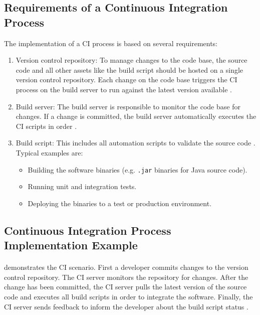 \subsection{Requirements of a Continuous Integration Process}
The implementation of a CI process is based on several requirements:
\begin{enumerate}
\item Version control repository:
To manage changes to the code base, the source code and all other assets like the build script should be hosted on a single version control repository.
Each change on the code base triggers the CI process on the build server to run against the latest version available \cite{Duvall2007CI}.

\item Build server:
The build server is responsible to monitor the code base for changes.
If a change is committed, the build server automatically executes the CI scripts in order \cite{Rossel2017CICD, Duvall2007CI}.

\item Build script:
This includes all automation scripts to validate the source code \cite{Duvall2007CI}. Typical examples are:
\begin{itemize}
\item Building the software binaries (e.g. \texttt{.jar} binaries for Java source code).
\item Running unit and integration tests.
\item Deploying the binaries to a test or production environment.
\end{itemize}
\end{enumerate}


\subsection{Continuous Integration Process Implementation Example}
\paragraph{} demonstrates the CI scenario.
First a developer commits changes to the version control repository.
The CI server monitors the repository for changes. After the change has been committed, the CI server pulls the latest version of the source code and executes all build scripts in order to integrate the software.
Finally, the CI server sends feedback to inform the developer about the build script status  \cite{Duvall2007CI}.


